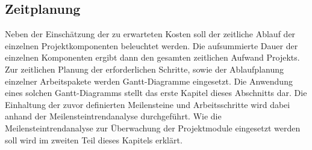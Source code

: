 \subsection{Zeitplanung}
Neben der Einschätzung der zu erwarteten Kosten soll der zeitliche Ablauf der einzelnen Projektkomponenten beleuchtet werden. Die aufsummierte Dauer der einzelnen Komponenten ergibt dann den gesamten zeitlichen Aufwand Projekts. Zur zeitlichen Planung der erforderlichen Schritte, sowie der Ablaufplanung einzelner Arbeitspakete werden Gantt-Diagramme eingesetzt. Die Anwendung eines solchen Gantt-Diagramms stellt das erste Kapitel dieses Abschnitts dar. Die Einhaltung der zuvor definierten Meilensteine und Arbeitsschritte wird dabei anhand der Meilensteintrendanalyse durchgeführt. Wie die Meilensteintrendanalyse zur Überwachung der Projektmodule eingesetzt werden soll wird im zweiten Teil dieses Kapitels erklärt. 